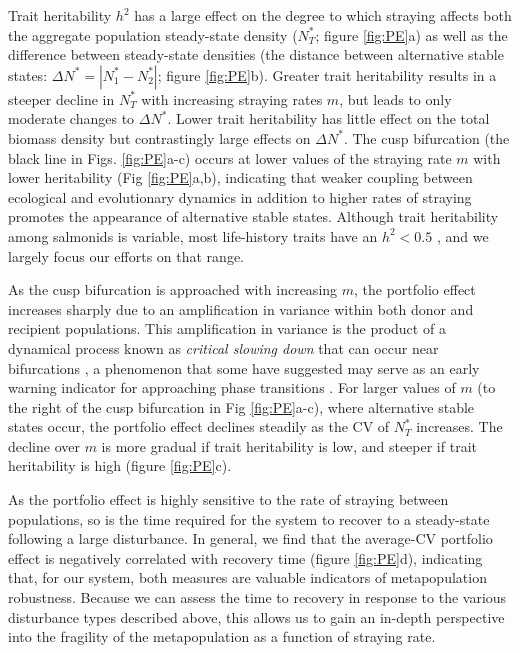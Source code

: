 \documentclass{revtex4}
\begin{document}
Trait heritability $h^2$ has a large effect on the degree to which straying affects both the aggregate population steady-state density ($N^*_T$; figure \ref{fig:PE}a) as well as the difference between steady-state densities (the distance between alternative stable states: $\Delta N^*=|N^*_1-N^*_2|$; figure \ref{fig:PE}b).
Greater trait heritability results in a steeper decline in $N_T^*$ with increasing straying rates $m$, but leads to only moderate changes to $\Delta N^*$.
Lower trait heritability has little effect on the total biomass density but contrastingly large effects on $\Delta N^*$.
The cusp bifurcation (the black line in Figs. \ref{fig:PE}a-c) occurs at lower values of the straying rate $m$ with lower heritability (Fig \ref{fig:PE}a,b), indicating that weaker coupling between ecological and evolutionary dynamics in addition to higher rates of straying promotes the appearance of alternative stable states.
Although trait heritability among salmonids is variable, most life-history traits have an $h^2 <0.5$ \citep{Carlson:2008hl}, and we largely focus our efforts on that range.

As the cusp bifurcation is approached with increasing $m$, the portfolio effect increases sharply due to an amplification in variance within both donor and recipient populations.
This amplification in variance is the product of a dynamical process known as \emph{critical slowing down} that can occur near bifurcations \citep{Scheffer:2009gg}, a phenomenon that some have suggested may serve as an early warning indicator for approaching phase transitions \citep{Scheffer:2009gg,Lade:2012eu,Anonymous:2013br,Dakos:2014br,Krkosek:2014ch}.
For larger values of $m$ (to the right of the cusp bifurcation in Fig \ref{fig:PE}a-c), where alternative stable states occur, the portfolio effect declines steadily as the CV of $N_T^*$ increases.
The decline over $m$ is more gradual if trait heritability is low, and steeper if trait heritability is high (figure \ref{fig:PE}c).

As the portfolio effect is highly sensitive to the rate of straying between populations, so is the time required for the system to recover to a steady-state following a large disturbance.
In general, we find that the average-CV portfolio effect is negatively correlated with recovery time (figure \ref{fig:PE}d), indicating that, for our system, both measures are valuable indicators of metapopulation robustness.
Because we can assess the time to recovery in response to the various disturbance types described above, this allows us to gain an in-depth perspective into the fragility of the metapopulation as a function of straying rate.
\end{document}
